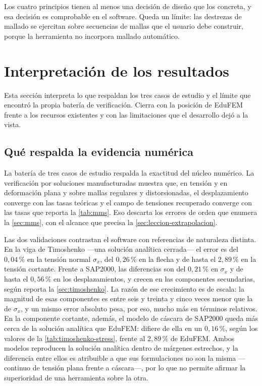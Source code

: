Los cuatro principios tienen al menos una decisión de diseño que los concreta, y esa decisión es comprobable en el software. Queda un límite: las destrezas de mallado se ejercitan sobre secuencias de mallas que el usuario debe construir, porque la herramienta no incorpora mallado automático.

\section{Interpretación de los resultados}
\label{sec:interpretacion}

Esta sección interpreta lo que respaldan los tres casos de estudio y el límite que encontró la propia batería de verificación. Cierra con la posición de EduFEM frente a los recursos existentes y con las limitaciones que el desarrollo dejó a la vista.

\subsection{Qué respalda la evidencia numérica}

La batería de tres casos de estudio respalda la exactitud del núcleo numérico. La verificación por soluciones manufacturadas muestra que, en tensión y en deformación plana y sobre mallas regulares y distorsionadas, el desplazamiento converge con las tasas teóricas y el campo de tensiones recuperado converge con las tasas que reporta la \autoref{tab:mms}. Eso descarta los errores de orden que enumera la \autoref{sec:mms}, con el alcance que precisa la \autoref{sec:leccion-extrapolacion}.

Las dos validaciones contrastan el software con referencias de naturaleza distinta. En la viga de Timoshenko —una solución analítica cerrada— el error es del $0{,}04\,\%$ en la tensión normal $\sigma_x$, del $0{,}26\,\%$ en la flecha y de hasta el $2{,}89\,\%$ en la tensión cortante. Frente a SAP2000, las diferencias son del $0{,}21\,\%$ en $\sigma_x$ y de hasta el $0{,}56\,\%$ en los desplazamientos, y crecen en las componentes secundarias, según reporta la \autoref{sec:timoshenko}. La razón de ese crecimiento es de escala: la magnitud de esas componentes es entre seis y treinta y cinco veces menor que la de $\sigma_x$, y un mismo error absoluto pesa, por eso, mucho más en términos relativos. En la componente cortante, además, el modelo de cáscara de SAP2000 queda más cerca de la solución analítica que EduFEM: difiere de ella en un $0{,}16\,\%$, según los valores de la \autoref{tab:timoshenko-stress}, frente al $2{,}89\,\%$ de EduFEM. Ambos modelos reproducen la solución analítica dentro de márgenes estrechos, y la diferencia entre ellos es atribuible a que sus formulaciones no son la misma —continuo de tensión plana frente a cáscara—, por lo que no permite afirmar la superioridad de una herramienta sobre la otra.

